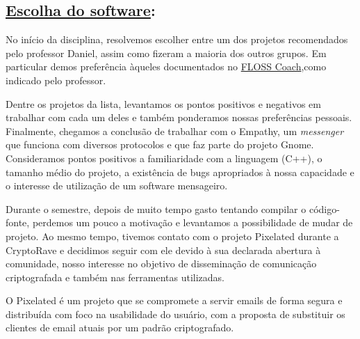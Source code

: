 \subsection*{\underline{Escolha do software}:}

No início da disciplina, resolvemos escolher entre um dos projetos
recomendados pelo professor Daniel, assim como fizeram a maioria dos outros
grupos. Em particular demos preferência àqueles documentados no
\href{http://flosscoach.com}{FLOSS Coach},como indicado pelo professor.

Dentre os projetos da lista, levantamos os pontos positivos e negativos
em trabalhar com cada um deles e também ponderamos nossas preferências
pessoais. Finalmente, chegamos a conclusão de trabalhar com o Empathy, um
\emph{messenger} que funciona com diversos protocolos e que faz parte do projeto
Gnome. Consideramos pontos positivos a familiaridade com a linguagem (C++), o
tamanho médio do projeto, a existência de bugs apropriados à nossa capacidade e
o interesse de utilização de um software mensageiro.

Durante o semestre, depois
de muito tempo gasto tentando compilar o código-fonte, perdemos um pouco a
motivação e levantamos a possibilidade de mudar de projeto.
Ao mesmo tempo, tivemos
contato com o projeto Pixelated durante a CryptoRave e decidimos seguir com ele
devido à sua declarada abertura à comunidade, nosso interesse no objetivo de
disseminação de comunicação criptografada e também nas ferramentas utilizadas.

O Pixelated é um projeto que se compromete a servir emails de forma segura e
distribuída com foco na usabilidade do usuário, com a
proposta de substituir os clientes de email atuais por um padrão criptografado.